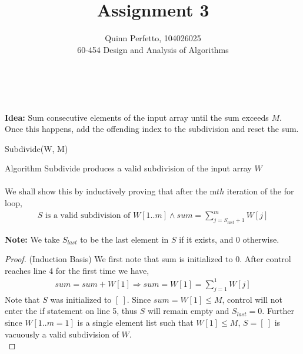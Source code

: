 \documentclass[12pt]{article}
\newenvironment{lemma}[2][Lemma]{\begin{trivlist}
\item[\hskip \labelsep {\bfseries #1}\hskip \labelsep {\bfseries #2.}]}{\end{trivlist}}
\newenvironment{question}[2][Question]{\begin{trivlist}
\item[\hskip \labelsep {\bfseries #1}\hskip \labelsep {\bfseries #2.}]}{\end{trivlist}}
\begin{document}
\title{Assignment 3}%
\author{Quinn Perfetto, 104026025\\ %
 60-454 Design and Analysis of Algorithms} %

\maketitle

\begin{question}{1}
  \leavevmode \\ \\
  \textbf{Idea:} Sum consecutive elements of the input array until the sum
  exceeds $M$.  Once this happens, add the offending index to the subdivision
  and reset the sum. \\
  \begin{algorithm}[H]
    \caption{Subdivide(W, M)}
    \BlankLine

  \end{algorithm}

  \begin{lemma}{1.1} Algorithm Subdivide produces a valid subdivision of the input array $W$
    \leavevmode \\ \\
    We shall show this by inductively proving that after the m$th$ iteration
    of the for loop,
    \begin{align*}
      S \text{ is a valid subdivision of } W[1..m] \land sum = \sum_{j=S_{last} + 1}^{m} W[j]
    \end{align*}

    \textbf{Note:} We take $S_{last}$ to be the last element in $S$ if it exists,
    and 0 otherwise. \\

    \begin{proof}
      (Induction Basis) We first note that sum is initialized to 0.  After
      control reaches line 4 for the first time we have,
      \begin{align*}
        sum = sum + W[1] \Rightarrow sum = W[1] = \sum_{j=1}^{1} W[j]
      \end{align*}
      Note that $S$ was initialized to $[\ ]$.  Since $sum = W[1] \leq M$, control
      will not enter the if statement on line 5, thus $S$ will remain empty and
      $S_{last} = 0$.  Further since $W[1..m=1]$ is a single element list such that
      $W[1] \leq M$, $S = [\ ]$ is vacuously a valid subdivision of $W$. \\


\end{proof}
\end{lemma}
\end{question}
\end{document}
